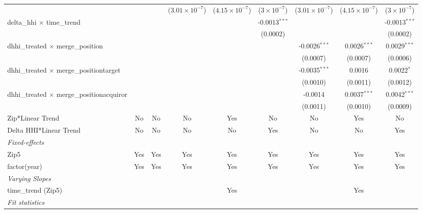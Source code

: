 \begin{table}[H]
{\begin{tabular}{lcccccccc}
   &   &    & ($3.01\times 10^{-7}$) & ($4.15\times 10^{-7}$) & ($3\times 10^{-7}$) & ($3.01\times 10^{-7}$) & ($4.15\times 10^{-7}$) & ($3\times 10^{-7}$)\\ 

 delta\_hhi $\times $ time\_trend&   &    &    &    & -0.0013$^{***}$ &    &    & -0.0013$^{***}$\\ 

   &   &    &    &    & (0.0002) &    &    & (0.0002)\\ 

 dhhi\_treated $\times $ merge\_position&   &    &    &    &    & -0.0026$^{***}$ & 0.0026$^{***}$ & 0.0029$^{***}$\\ 

   &   &    &    &    &    & (0.0007) & (0.0007) & (0.0006)\\ 

 dhhi\_treated $\times $ merge\_positiontarget&   &    &    &    &    & -0.0035$^{***}$ & 0.0016 & 0.0022$^{*}$\\ 

   &   &    &    &    &    & (0.0010) & (0.0011) & (0.0012)\\ 

 dhhi\_treated $\times $ merge\_positionacquiror&   &    &    &    &    & -0.0014 & 0.0037$^{***}$ & 0.0042$^{***}$\\ 

   &   &    &    &    &    & (0.0011) & (0.0010) & (0.0009)\\ 

 Zip*Linear Trend & No & No & No & Yes & No & No & Yes & No\\ 

 Delta HHI*Linear Trend & No & No & No & No & Yes & No & No & Yes\\ 

 \midrule \emph{Fixed-effects}&   &   &   &   &   &   &   &  \\ 

 Zip5 & Yes & Yes & Yes & Yes & Yes & Yes & Yes & Yes\\ 

 factor(year) & Yes & Yes & Yes & Yes & Yes & Yes & Yes & Yes\\ 

 \midrule \emph{Varying Slopes}&   &   &   &   &   &   &   &  \\ 

 time\_trend (Zip5) &  &  &  & Yes &  &  & Yes & \\ 

 \midrule \emph{Fit statistics}&  & & & & & & & \\ 


\end{tabular}}
\end{table}
